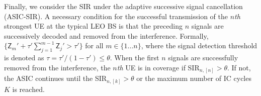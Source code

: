 \documentclass[lettersize,journal]{IEEEtran}
\begin{document}

Finally, we consider the SIR under the adaptive successive signal cancellation (ASIC-SIR). A necessary condition for the successful transmission of the $n$\textit{th} strongest UE at the typical LEO BS is that the preceding $n$ signals are successively decoded and removed from the interference. Formally, $\{\mathsf{Z}_m'+\tau'\sum_{j=1}^{m-1}\mathsf{Z}_j'>\tau'\}$ for all $m \in \{1 \dots n\}$, where the signal detection threshold is denoted as $ \tau = \tau'/(1-\tau') \leq \theta$. When the first $n$ signals are successfully removed from the interference, the $n$\textit{th} UE is in coverage if SIR$_{n,[n]}>\theta$. If not, the ASIC continues until the SIR$_{n,[k]}>\theta$ or the maximum number of IC cycles $K$ is reached. %
\end{document}
